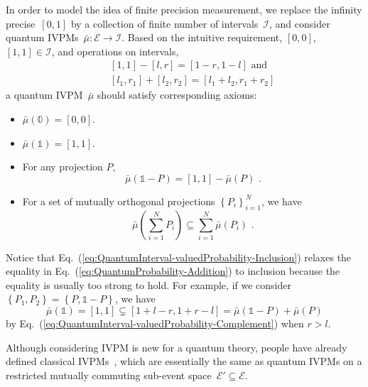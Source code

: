 \documentclass[english,reprint, aps, prl,superscriptaddress, showpacs,
showkeys]{revtex4-1}
\theoremstyle{plain}
\theoremstyle{definition}
\newcommand{\events}{\ensuremath{\mathcal{E}}}
\begin{document}
In order to model the idea of finite precision measurement, we replace
the infinity precise~$[0,1]$ by a collection of finite number of
intervals~$\mathscr{I}$, and consider quantum IVPMs~$\bar{\mu}:\events\rightarrow\mathscr{I}$.
Based on the intuitive requirement, $\left[0,0\right]$, $\left[1,1\right]\in\mathscr{I}$,
and operations on intervals,\begin{subequations}
\begin{eqnarray}
 &  & \left[1,1\right]-\left[l,r\right]=\left[1-r,1-l\right]\textrm{ and}\\
 &  & [l_{1},r_{1}]+[l_{2},r_{2}]=[l_{1}+l_{2},r_{1}+r_{2}]
\end{eqnarray}
\end{subequations}a quantum IVPM~$\bar{\mu}$ should satisfy corresponding
axioms:
\begin{itemize}
\item $\bar{\mu}(\mathbb{0})=\left[0,0\right]$. 
\item $\bar{\mu}(\mathbb{1})=\left[1,1\right]$. 
\item For any projection $P$, 
\begin{equation}
\bar{\mu}\left(\mathbb{1}-P\right)=\left[1,1\right]-\bar{\mu}\left(P\right)\textrm{ .}\label{eq:QuantumInterval-valuedProbability-Complement}
\end{equation}
\item For a set of mutually orthogonal projections $\left\{ P_{i}\right\} _{i=1}^{N}$,
we have 
\begin{equation}
\bar{\mu}\left(\sum_{i=1}^{N}P_{i}\right)\subseteq\sum_{i=1}^{N}\bar{\mu}\left(P_{i}\right)\textrm{ .}\label{eq:QuantumInterval-valuedProbability-Inclusion}
\end{equation}
\end{itemize}
Notice that Eq.~(\ref{eq:QuantumInterval-valuedProbability-Inclusion})
relaxes the equality in Eq.~(\ref{eq:QuantumProbability-Addition})
to inclusion because the equality is usually too strong to hold. For
example, if we consider $\left\{ P_{1},P_{2}\right\} =\left\{ P,\mathbb{1}-P\right\} $,
we have 
\[
\bar{\mu}(\mathbb{1})=\left[1,1\right]\subsetneq\left[1+l-r,1+r-l\right]=\bar{\mu}\left(\mathbb{1}-P\right)+\bar{\mu}\left(P\right)
\]
by Eq.~(\ref{eq:QuantumInterval-valuedProbability-Complement}) when
$r>l$.

Although considering IVPM is new for a quantum theory, people have
already defined classical IVPMs~\citep{JamisonLodwick2004}, which
are essentially the same as quantum IVPMs on a restricted mutually
commuting sub-event space~$\events'\subseteq\events$.
\end{document}
